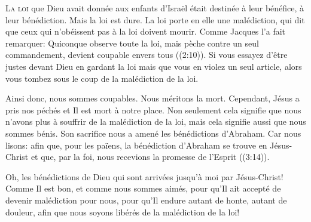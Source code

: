 





\lettrine{L}{a loi} que Dieu avait donnée aux enfants d'Israël
 était destinée à leur bénéfice, à leur bénédiction.
 Mais la loi est dure. La loi porte en elle une malédiction,
 qui dit que ceux qui n'obéissent pas à la loi doivent mourir.
 Comme Jacques l'a fait remarquer: 
 \Og Quiconque observe toute la loi, mais pèche contre un seul commandement,
 devient coupable envers tous \Fg{} ((2:10)).
 Si vous essayez d'être justes devant Dieu en gardant la loi
 mais que vous en violez un seul article,
 alors vous tombez sous le coup de la malédiction de la loi.

Ainsi donc, nous sommes coupables. Nous méritons la mort.
 Cependant, Jésus a pris nos péchés et Il est mort à notre place.
 Non seulement cela signifie que nous n'avons plus  à souffrir de la malédiction
 de la loi, mais cela signifie aussi que nous sommes bénis.
 Son sacrifice nous a amené les bénédictions d'Abraham.
 Car nous lisons: 
 \Og afin que, pour les païens, la bénédiction d'Abraham se trouve
 en Jésus-Christ et que, par la foi, nous recevions la promesse
 de l'Esprit \Fg{} ((3:14)).


Oh, les bénédictions de Dieu qui sont arrivées jusqu'à moi
 par Jésus-Christ! Comme Il est bon, et comme nous sommes aimés,
 pour qu'Il ait accepté de devenir malédiction pour nous,
 pour qu'Il endure autant de honte, autant de douleur,
 afin que nous soyons libérés de la malédiction de la loi!


